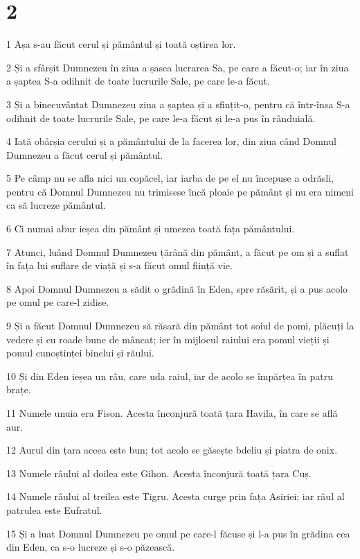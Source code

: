 \chapter{2}

\par 1 Așa s-au făcut cerul și pământul și toată oștirea lor.
\par 2 Și a sfârșit Dumnezeu în ziua a șasea lucrarea Sa, pe care a făcut-o; iar în ziua a șaptea S-a odihnit de toate lucrurile Sale, pe care le-a făcut.
\par 3 Și a binecuvântat Dumnezeu ziua a șaptea și a sfințit-o, pentru că într-însa S-a odihnit de toate lucrurile Sale, pe care le-a făcut și le-a pus în rânduială.
\par 4 Iată obârșia cerului și a pământului de la facerea lor, din ziua când Domnul Dumnezeu a făcut cerul și pământul.
\par 5 Pe câmp nu se afla nici un copăcel, iar iarba de pe el nu începuse a odrăsli, pentru că Domnul Dumnezeu nu trimisese încă ploaie pe pământ și nu era nimeni ca să lucreze pământul.
\par 6 Ci numai abur ieșea din pământ și umezea toată fața pământului.
\par 7 Atunci, luând Domnul Dumnezeu țărână din pământ, a făcut pe om și a suflat în fața lui suflare de viață și s-a făcut omul ființă vie.
\par 8 Apoi Domnul Dumnezeu a sădit o grădină în Eden, spre răsărit, și a pus acolo pe omul pe care-l zidise.
\par 9 Și a făcut Domnul Dumnezeu să răsară din pământ tot soiul de pomi, plăcuți la vedere și cu roade bune de mâncat; ier în mijlocul raiului era pomul vieții și pomul cunoștinței binelui și răului.
\par 10 Și din Eden ieșea un râu, care uda raiul, iar de acolo se împărțea în patru brațe.
\par 11 Numele unuia era Fison. Acesta înconjură toată țara Havila, în care se află aur.
\par 12 Aurul din țara aceea este bun; tot acolo se găsește bdeliu și piatra de onix.
\par 13 Numele râului al doilea este Gihon. Acesta înconjură toată țara Cuș.
\par 14 Numele râului al treilea este Tigru. Acesta curge prin fața Asiriei; iar râul al patrulea este Eufratul.
\par 15 Și a luat Domnul Dumnezeu pe omul pe care-l făcuse și l-a pus în grădina cea din Eden, ca s-o lucreze și s-o păzească.
